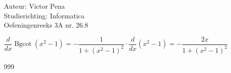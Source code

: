 \documentclass[a4paper]{article}
\begin{document}
	
	\noindent \large Auteur: Victor Pena \\
	\noindent \large Studierichting: Informatica\\
	\noindent \large Oefeningenreeks 3A nr. 26.8\\
	
	\medskip
	
	\normalsize 
	
	$\dfrac{d}{dx}\operatorname{Bgcot}\left(x^2-1\right) = -\dfrac{1}{1+(x^2-1)^2} \cdot \dfrac{d}{dx}\left(x^2-1\right) = -\dfrac{2x}{1+(x^2-1)^2}$
	
	
	\begin{thebibliography}{999}
	\end{thebibliography}
\end{document}
